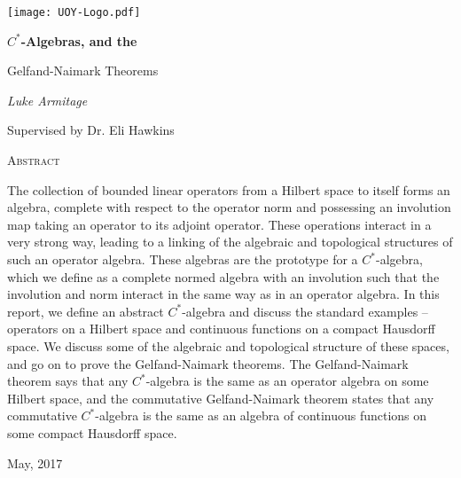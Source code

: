 \documentclass[11pt,a4paper]{report}
\theoremstyle{plain}
\theoremstyle{definition}
\newcommand{\1}{\mathbbm{1}}
\begin{document}
\begin{titlepage}
	{\centering
	{\texttt{[image: UOY-Logo.pdf]}\par 
	}
	\vspace{0.5cm}
	{\Huge \bfseries $C^\ast$-Algebras, and the 
				\par Gelfand-Naimark Theorems \par}
	\vspace{1.5cm}
	{\Large\itshape Luke Armitage \par}
	\vspace{0.25cm}
	{\large Supervised by Dr. Eli Hawkins \par}
	
	\vfill
	
	{\scshape\small Abstract \par}}
	{\small The collection of bounded linear operators from a Hilbert space to 
	itself forms an algebra, complete with respect to the operator norm and 
	possessing an involution map taking an operator to its adjoint operator. These 
	operations interact in a very strong way, leading to a linking of the algebraic 
	and topological structures of such an operator algebra. These algebras 
	are the prototype for a $C^\ast$-algebra, which we define as a complete normed 
	algebra with an involution such that the involution and norm interact in the 
	same way as in an operator algebra. In this report, we define an abstract 
	$C^\ast$-algebra and discuss the standard examples -- operators on a Hilbert 
	space and continuous functions on a compact Hausdorff space. We discuss some of 
	the algebraic and topological structure of these spaces, and go on to prove the 
	Gelfand-Naimark theorems. The Gelfand-Naimark theorem says that any 
	$C^\ast$-algebra is the same as an operator algebra on some Hilbert space, 
	and the commutative Gelfand-Naimark theorem states that any commutative 
	$C^\ast$-algebra is the same as an algebra of continuous functions on some 
	compact Hausdorff space.}\par
	
	\vspace{1cm}
	{\large\centering May, 2017 \par}
	
\end{titlepage}



\tableofcontents
\end{document}
